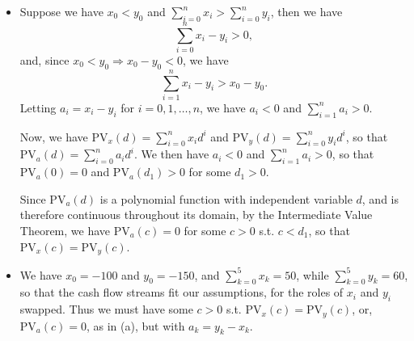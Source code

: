 \begin{itemize}
    \item[(a)] Suppose we have $x_0 < y_0$ and
        $\sum_{i=0}^n{x_i} > \sum_{i=0}^n{y_i}$, then we have
        \[
            \sum_{i=0}^n{x_i - y_i} > 0,
        \]
        and, since $x_0 < y_0 \Rightarrow x_0 - y_0 < 0$, we have
        \[
            \sum_{i=1}^n{x_i - y_i} > x_0 - y_0.
        \]
        Letting $a_i = x_i - y_i$ for $i = 0, 1, \ldots, n$, we have $a_i < 0$
        and $\sum_{i=1}^n{a_i} > 0$.

        Now, we have $\text{PV}_x(d) = \sum_{i=0}^n{x_i d^i}$ and
        $\text{PV}_y(d) = \sum_{i=0}^n{y_i d^i}$, so that
        $\text{PV}_a(d) = \sum_{i=0}^n{a_i d^i}$. We then have $a_i < 0$ and
        $\sum_{i=1}^n a_i > 0$, so that $\text{PV}_a(0) = 0$ and
        $\text{PV}_a(d_1) > 0$ for some $d_1 > 0$.

        Since $\text{PV}_a(d)$ is a polynomial function with independent
        variable $d$, and is therefore continuous throughout its domain, by the
        Intermediate Value Theorem, we have $\text{PV}_a(c) = 0$ for some
        $c > 0$ s.t. $c < d_1$, so that $\text{PV}_x(c) = \text{PV}_y(c)$.
    \item[(b)] We have $x_0 = -100$ and $y_0 = -150$, and
        $\sum_{k=0}^5{x_k} = 50$, while $\sum_{k=0}^5{y_k} = 60$, so that the
        cash flow streams fit our assumptions, for the roles of $x_i$ and $y_i$
        swapped. Thus we must have some $c > 0$ s.t.
        $\text{PV}_x(c) = \text{PV}_y(c)$, or, $\text{PV}_a(c) = 0$, as in (a),
        but with $a_k = y_k - x_k$.


\end{itemize}
